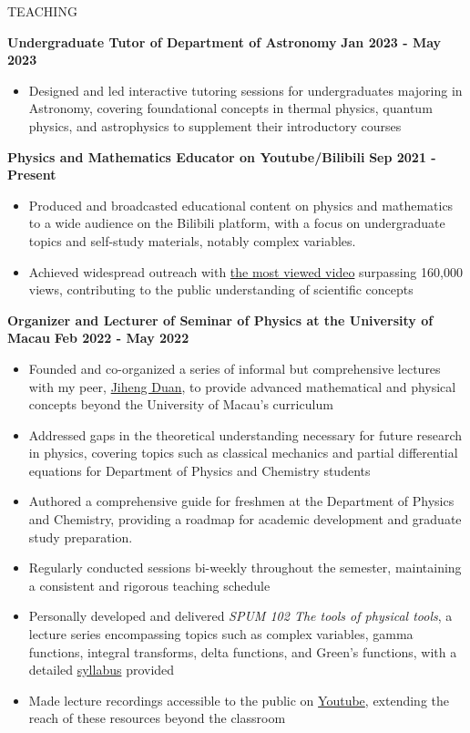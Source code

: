 \documentclass[10pt]{article} %
\begin{document}
\begin{section}{TEACHING}

\textbf{Undergraduate Tutor of Department of Astronomy} \hfill \textbf{Jan 2023 - May 2023}
\begin{itemize}[leftmargin=1.5em]
    \item Designed and led interactive tutoring sessions for undergraduates majoring in Astronomy, covering foundational concepts in thermal physics, quantum physics, and astrophysics to supplement their introductory courses
\end{itemize}

\textbf{Physics and Mathematics Educator on Youtube/Bilibili} \hfill \textbf{Sep 2021 - Present}
\begin{itemize}[leftmargin=1.5em]
    \item Produced and broadcasted  educational content on physics and mathematics to a wide audience on the Bilibili platform, with a focus on undergraduate topics and self-study materials, notably complex variables.
    \item Achieved widespread outreach with \href{https://www.bilibili.com/video/BV1th411W7xu/}{the most viewed video} surpassing 160,000 views, contributing to the public understanding of scientific concepts
\end{itemize}

\textbf{Organizer and Lecturer of Seminar of Physics at the University of Macau} \hfill \textbf{Feb 2022 - May 2022}
\begin{itemize}[leftmargin=1.5em]
    \item Founded and co-organized a series of informal but comprehensive lectures with my peer, \href{http://runawayfancy.me/}{Jiheng Duan}, to provide advanced mathematical and physical concepts beyond the University of Macau's curriculum
    \item Addressed gaps in the theoretical understanding necessary for future research in physics, covering topics such as classical mechanics and partial differential equations for Department of Physics and Chemistry students
    \item Authored a comprehensive guide for freshmen at the Department of Physics and Chemistry, providing a roadmap for academic development and graduate study preparation.
    \item Regularly conducted sessions bi-weekly throughout the semester, maintaining a consistent and rigorous teaching schedule
    \item Personally developed and delivered \textit{SPUM 102 The tools of physical tools}, a lecture series encompassing topics such as complex variables, gamma functions, integral transforms, delta functions, and Green's functions, with a detailed \href{https://github.com/Chisen-Lupus/Seminar-of-Physics-UM/blob/main/SPUM%20102%20The%20tools%20of%20physical%20tool.pdf}{syllabus} provided
    \item Made lecture recordings accessible to the public on \href{https://www.youtube.com/watch?v=nQkv03r-XeQ&list=PLV9fHDZW7hHWQ9rrAk7c9kdeV-Lqyt7pV&index=10}{Youtube}, extending the reach of these resources beyond the classroom
\end{itemize}


\end{section}
\end{document}
